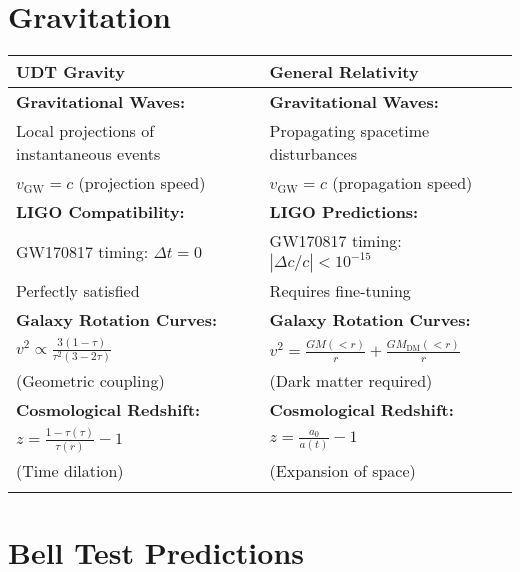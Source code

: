 \documentclass[11pt,a4paper]{article}
\begin{document}
\section{Gravitation}

\begin{center}
\begin{tabular}{|p{}|p{}|}
\hline
\textcolor{udtblue}{\textbf{UDT Gravity}} & \textcolor{standardred}{\textbf{General Relativity}} \\
\hline
\vspace{0.3cm}
\textbf{Gravitational Waves:} & \textbf{Gravitational Waves:} \\
Local projections of instantaneous events & Propagating spacetime disturbances \\
$v_{\text{GW}} = c$ (projection speed) & $v_{\text{GW}} = c$ (propagation speed) \\
\vspace{0.3cm}

\textbf{LIGO Compatibility:} & \textbf{LIGO Predictions:} \\
GW170817 timing: $\Delta t = 0$ & GW170817 timing: $|\Delta c/c| < 10^{-15}$ \\
\textcolor{udtblue}{Perfectly satisfied} & \textcolor{standardred}{Requires fine-tuning} \\
\vspace{0.3cm}

\textbf{Galaxy Rotation Curves:} & \textbf{Galaxy Rotation Curves:} \\
$v^2 \propto \frac{3(1-\tau)}{\tau^2(3-2\tau)}$ & $v^2 = \frac{GM(<r)}{r} + \frac{GM_{\text{DM}}(<r)}{r}$ \\
(Geometric coupling) & (Dark matter required) \\
\vspace{0.3cm}

\textbf{Cosmological Redshift:} & \textbf{Cosmological Redshift:} \\
$z = \frac{1-\tau(\tau)}{\tau(r)} - 1$ & $z = \frac{a_0}{a(t)} - 1$ \\
(Time dilation) & (Expansion of space) \\
\vspace{0.3cm}
\hline
\end{tabular}
\end{center}

\section{Bell Test Predictions}
\end{document}

